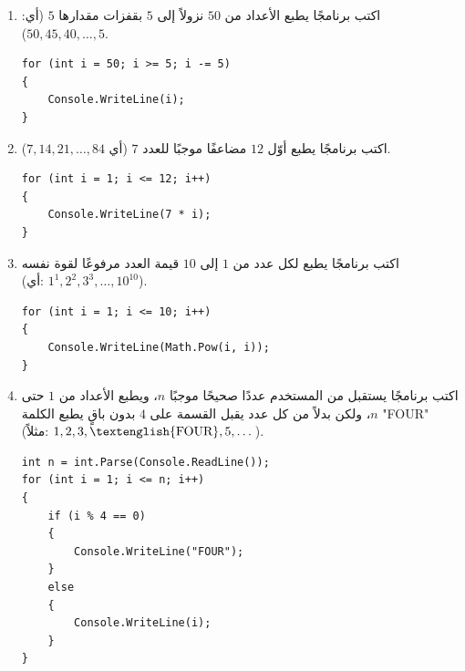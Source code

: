 \documentclass[14pt]{extarticle}
\begin{document}
\begin{enumerate}[resume, itemsep=1em]
\item اكتب برنامجًا يطبع الأعداد من $50$ نزولاً إلى $5$ بقفزات مقدارها $5$ (أي: $50, 45, 40, \dots, 5$).
\ifwithsols
\begin{boxSolution}
\begin{english}
\begin{verbatim}
for (int i = 50; i >= 5; i -= 5)
{
    Console.WriteLine(i);
}
\end{verbatim}
\end{english}
\end{boxSolution}
\fi
\filbreak

\item اكتب برنامجًا يطبع أوّل $12$ مضاعفًا موجبًا للعدد $7$ (أي $7, 14, 21, \dots, 84$).
\ifwithsols
\begin{boxSolution}
\begin{english}
\begin{verbatim}
for (int i = 1; i <= 12; i++)
{
    Console.WriteLine(7 * i);
}
\end{verbatim}
\end{english}
\end{boxSolution}
\fi
\filbreak

\item اكتب برنامجًا يطبع لكل عدد من $1$ إلى $10$ قيمة العدد مرفوعًا لقوة نفسه \\ (أي: $1^1, 2^2, 3^3, \ldots, 10^{10}$).
\ifwithsols
\begin{boxSolution}
\begin{english}
\begin{verbatim}
for (int i = 1; i <= 10; i++)
{
    Console.WriteLine(Math.Pow(i, i));
}
\end{verbatim}
\end{english}
\end{boxSolution}
\fi
\filbreak

\item اكتب برنامجًا يستقبل من المستخدم عددًا صحيحًا موجبًا $n$، ويطبع الأعداد من $1$ حتى $n$، ولكن بدلاً من كل عدد يقبل القسمة على $4$ بدون باقٍ يطبع الكلمة \textenglish{"FOUR"} (مثلاً: $1, 2, 3, \text{\textenglish{FOUR}}, 5, \dots$).
\ifwithsols
\begin{boxSolution}
\begin{english}
\begin{verbatim}
int n = int.Parse(Console.ReadLine());
for (int i = 1; i <= n; i++)
{
    if (i % 4 == 0)
    {
        Console.WriteLine("FOUR");
    }
    else
    {
        Console.WriteLine(i);
    }
}
\end{verbatim}
\end{english}
\end{boxSolution}
\fi
\filbreak


\end{enumerate}
\end{document}
